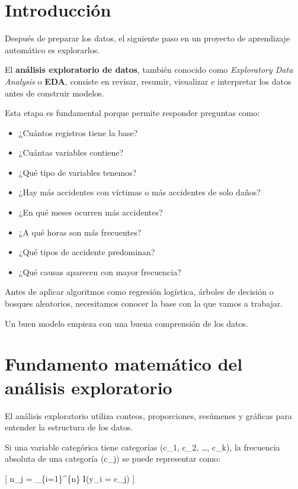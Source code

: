 \documentclass[
  11pt,
  letterpaper,
]{book}
\providecommand{\tightlist}{%
  \setlength{\itemsep}{0pt}\setlength{\parskip}{0pt}}
\begin{document}
\section{Introducción}\label{introducciuxf3n-2}

Después de preparar los datos, el siguiente paso en un proyecto de
aprendizaje automático es explorarlos.

El \textbf{análisis exploratorio de datos}, también conocido como
\emph{Exploratory Data Analysis} o \textbf{EDA}, consiste en revisar,
resumir, visualizar e interpretar los datos antes de construir modelos.

Esta etapa es fundamental porque permite responder preguntas como:

\begin{itemize}
\tightlist
\item
  ¿Cuántos registros tiene la base?
\item
  ¿Cuántas variables contiene?
\item
  ¿Qué tipo de variables tenemos?
\item
  ¿Hay más accidentes con víctimas o más accidentes de solo daños?
\item
  ¿En qué meses ocurren más accidentes?
\item
  ¿A qué horas son más frecuentes?
\item
  ¿Qué tipos de accidente predominan?
\item
  ¿Qué causas aparecen con mayor frecuencia?
\end{itemize}

Antes de aplicar algoritmos como regresión logística, árboles de
decisión o bosques aleatorios, necesitamos conocer la base con la que
vamos a trabajar.

Un buen modelo empieza con una buena comprensión de los datos.

\section{Fundamento matemático del análisis
exploratorio}\label{fundamento-matemuxe1tico-del-anuxe1lisis-exploratorio}

El análisis exploratorio utiliza conteos, proporciones, resúmenes y
gráficas para entender la estructura de los datos.

Si una variable categórica tiene categorías (c\_1, c\_2, \ldots, c\_k),
la frecuencia absoluta de una categoría (c\_j) se puede representar
como:

{[} n\_j = \sum\_\{i=1\}\^{}\{n\} I(y\_i = c\_j) {]}
\end{document}
